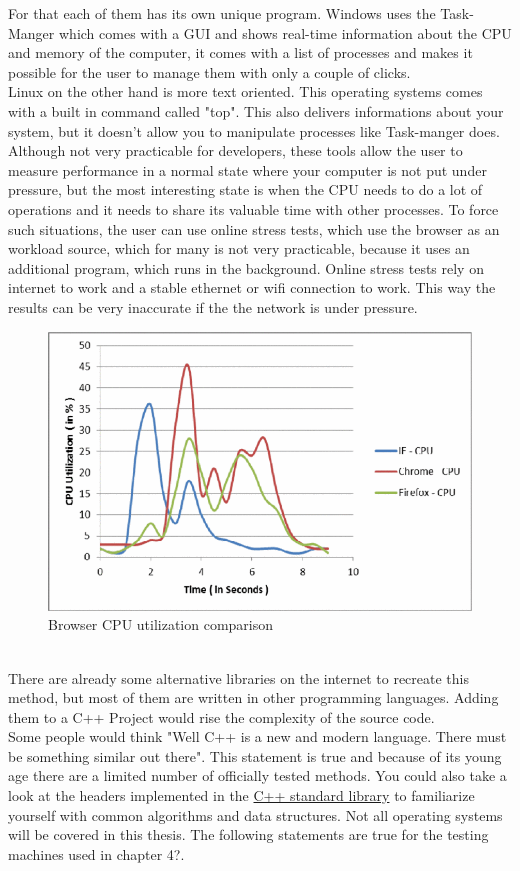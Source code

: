 For that each of them has its own unique program. Windows uses the \dq Task-Manger\dq{} which comes with a GUI and shows real-time information about the CPU and memory of the computer, it comes with a list of processes and makes it possible for the user to manage them with only a couple of clicks.\\
Linux on the other hand is more text oriented. This operating systems comes with a built in command called "top". This also delivers informations about your system, but it doesn't allow you to manipulate processes like \dq Task-manger\dq{} does. Although not very practicable for developers, these tools allow the user to measure performance in a normal state where your computer is not put under pressure, but the most interesting state is when the CPU needs to do a lot of operations and it needs to share its valuable time with other processes. To force such situations, the user can use online stress tests, which use the browser as an workload source, which for many is not very practicable, because it uses an additional program, which runs in the background. Online stress tests rely on internet to work and a stable ethernet or wifi connection to work. This way the results can be very inaccurate if the the network is under pressure.
\begin{figure}[h]
	\centering
	\includegraphics[scale=0.25]{figures/einleitung/browser_comparisson.png}
	\caption{Browser CPU utilization comparison\cite{6724273}}
	\label{browser_comp}
\end{figure}
\\
There are already some alternative libraries on the internet to recreate this method, but most of them are written in other programming languages. Adding them to a C++ Project would rise the complexity of the source code.\\
Some people would think "Well C++ is a new and modern language. There must be something similar out there". This statement is true and because of its young age there are a limited number of officially tested methods. You could also take a look at the headers implemented in the \href{https://en.cppreference.com/w/cpp/header}{C++ standard library} \cite{CppRef} to familiarize yourself with common algorithms and data structures.
Not all operating systems will be covered in this thesis.
The following statements are true for the testing machines used in chapter 4?.
